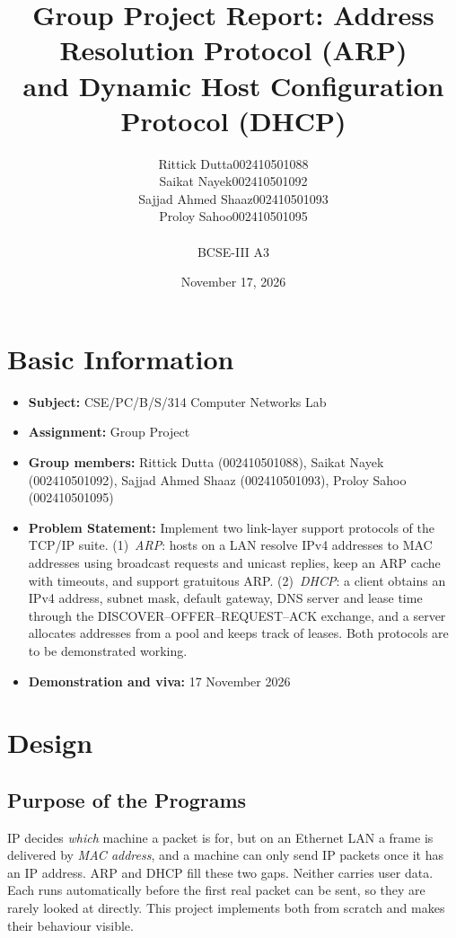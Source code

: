 \documentclass[11pt]{article}
\title{\Large\textbf{Group Project Report: Address Resolution Protocol (ARP)\\
and Dynamic Host Configuration Protocol (DHCP)}}
\author{
\begin{tabular}{ll}
Rittick Dutta & 002410501088 \\
Saikat Nayek & 002410501092 \\
Sajjad Ahmed Shaaz & 002410501093 \\
Proloy Sahoo & 002410501095 \\
\end{tabular}\\[0.6em]
BCSE-III A3}
\date{November 17, 2026}
\begin{document}
\maketitle

\section*{Basic Information}
\begin{itemize}[leftmargin=1.6em]
  \item \textbf{Subject:} CSE/PC/B/S/314 Computer Networks Lab
  \item \textbf{Assignment:} Group Project
  \item \textbf{Group members:} Rittick Dutta (002410501088), Saikat Nayek (002410501092),
  Sajjad Ahmed Shaaz (002410501093), Proloy Sahoo (002410501095)
  \item \textbf{Problem Statement:} Implement two link-layer support protocols of the
  TCP/IP suite. (1)~\emph{ARP}: hosts on a LAN resolve IPv4 addresses to MAC addresses
  using broadcast requests and unicast replies, keep an ARP cache with timeouts, and
  support gratuitous ARP. (2)~\emph{DHCP}: a client obtains an IPv4 address, subnet mask,
  default gateway, DNS server and lease time through the DISCOVER--OFFER--REQUEST--ACK
  exchange, and a server allocates addresses from a pool and keeps track of leases. Both
  protocols are to be demonstrated working.
  \item \textbf{Demonstration and viva:} 17 November 2026
\end{itemize}

\section{Design}

\subsection{Purpose of the Programs}
IP decides \emph{which} machine a packet is for, but on an Ethernet LAN a frame is
delivered by \emph{MAC address}, and a machine can only send IP packets once it has an IP
address. ARP and DHCP fill these two gaps. Neither carries user data. Each runs
automatically before the first real packet can be sent, so they are rarely looked at
directly. This project implements both from scratch and makes their behaviour visible.
\end{document}
